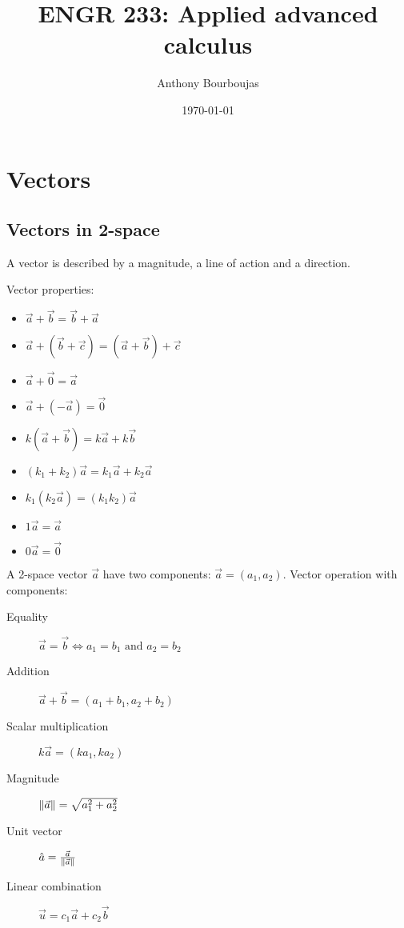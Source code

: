 \documentclass[10pt, twocolumn]{article}
\title{ENGR 233: Applied advanced calculus}
\date{\today}
\author{Anthony Bourboujas}
\theoremstyle{remark}
\begin{document}
\maketitle %

\setcounter{section}{6}
\section{Vectors}
\subsection{Vectors in 2-space}
A vector is described by a magnitude, a line of action and a direction.

Vector properties:
\begin{itemize}
  \item \(\vec{a} + \vec{b} = \vec{b} + \vec{a}\)
  \item \(\vec{a} + (\vec{b} + \vec{c}) = (\vec{a} + \vec{b}) + \vec{c}\)
  \item \(\vec{a} + \vec{0} = \vec{a}\)
  \item \(\vec{a} + (-\vec{a}) = \vec{0}\)
  \item \(k(\vec{a} + \vec{b}) = k\vec{a} + k\vec{b}\)
  \item \((k_1 + k_2 )\vec{a} = k_1 \vec{a} + k_2 \vec{a}\)
  \item \(k_1 (k_2 \vec{a}) = (k_1 k_2 )\vec{a}\)
  \item \(1\vec{a} = \vec{a}\)
  \item \(0\vec{a} = \vec{0}\)
\end{itemize}

A 2-space vector \(\vec{a}\) have two components: \(\vec{a} = (a_1 , a_2 )\).
Vector operation with components:
\begin{description}
  \item[Equality] \(\vec{a} = \vec{b} \iff a_1 = b_1 \text{ and } a_2 = b_2 \)
  \item[Addition] \(\vec{a} + \vec{b} = (a_1 + b_1 , a_2 + b_2 )\)
  \item[Scalar multiplication] \(k\vec{a} = (ka_1 , ka_2 )\)
  \item[Magnitude] \(\left\| \vec{a} \right\| = \sqrt{a_1 ^2 + a_2 ^2 }\)
  \item[Unit vector] \(\hat{a} = \frac{\vec{a}}{\left\| \vec{a} \right\|}\)
  \item[Linear combination] \(\vec{u} = c_1 \vec{a} + c_2 \vec{b}\)
\end{description}
\end{document}
